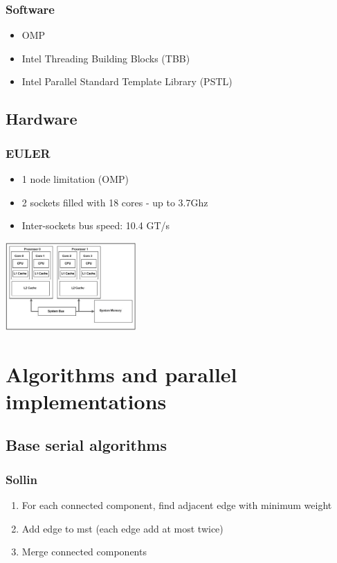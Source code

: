 \documentclass{beamer}
\begin{document}
\begin{frame}
\frametitle{Software}
\centering

\begin{itemize}
\item OMP
\item Intel Threading Building Blocks (TBB)
\item Intel Parallel Standard Template Library (PSTL)
\end{itemize}

\end{frame}

\subsection{Hardware}

\begin{frame}
\frametitle{EULER}
\centering

\begin{itemize}
\item 1 node limitation (OMP)
\item 2 sockets filled with 18 cores - up to 3.7Ghz
\item Inter-sockets bus speed: 10.4 GT/s
\end{itemize}

\includegraphics[width=5cm]{dual_sockets_caches.png}
\end{frame}



\section{Algorithms and parallel implementations}

\subsection{Base serial algorithms}

\begin{frame}[fragile]
\frametitle{Sollin}
\begin{enumerate}
	\item For each connected component, find adjacent edge with minimum weight
	\item Add edge to mst (each edge add at most twice)
	\item Merge connected components
\end{enumerate}
\end{frame}
\end{document}
